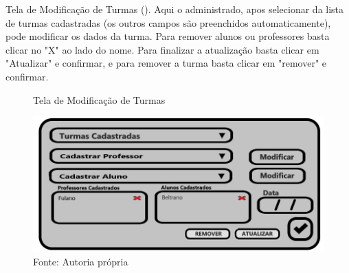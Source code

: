 \documentclass{utfpr-pg}
\begin{document}
        Tela de Modificação de Turmas (). Aqui o administrado, apos selecionar da lista de turmas cadastradas (os outros campos são preenchidos automaticamente), pode modificar os dados da turma. Para remover alunos ou professores basta clicar no "X" ao lado do nome. Para finalizar a atualização basta clicar em "Atualizar" e confirmar, e para remover a turma basta clicar em "remover" e confirmar.
        \begin{figure}[H]
            \centering
            \captionsetup{width=0.9\textwidth}
            \caption{Tela de Modificação de Turmas}
            \includegraphics[width=\linewidth]{fotos/15.jpg}
            \caption*{Fonte: Autoria própria}
            \label{fig:15}
        \end{figure}
        
\end{document}
